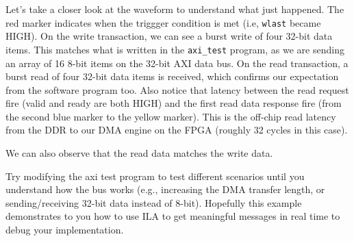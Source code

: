 \documentclass[11pt]{article}
\begin{document}
\begin{center}
\end{center}

Let's take a closer look at the waveform to understand what just happened. The red marker indicates when the triggger condition is met (i.e, \verb|wlast| became HIGH). On the write transaction, we can see a burst write of four 32-bit data items. This matches what is written in the \verb|axi_test| program, as we are sending an array of 16 8-bit items on the 32-bit AXI data bus. On the read transaction, a burst read of four 32-bit data items is received, which confirms our expectation from the software program too. Also notice that latency between the read request fire (valid and ready are both HIGH) and the first read data response fire (from the second blue marker to the yellow marker). This is the off-chip read latency from the DDR to our DMA engine on the FPGA (roughly 32 cycles in this case).

\begin{center}
\end{center}

We can also observe that the read data matches the write data.

\begin{center}
\end{center}

Try modifying the axi test program to test different scenarios until you understand how the bus works (e.g., increasing the DMA transfer length, or sending/receiving 32-bit data instead of 8-bit). Hopefully this example demonstrates to you how to use ILA to get meaningful messages in real time to debug your implementation.
\end{document}
